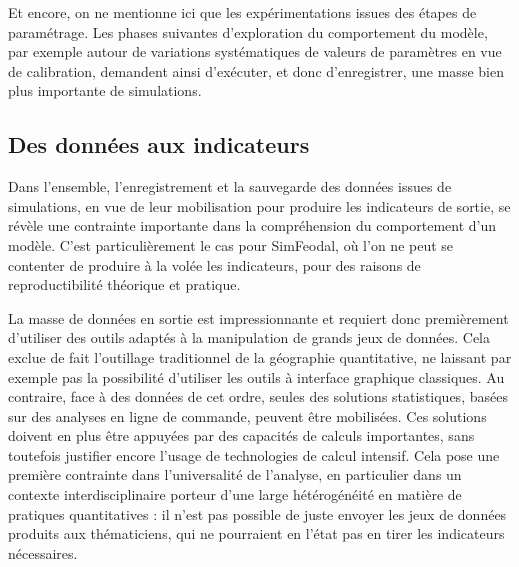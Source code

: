 	Et encore, on ne mentionne ici que les expérimentations issues des étapes de paramétrage.
	Les phases suivantes d'exploration du comportement du modèle, par exemple autour de variations systématiques de valeurs de paramètres en vue de calibration, demandent ainsi d'exécuter, et donc d'enregistrer, une masse bien plus importante de simulations.

	\subsection{Des données aux indicateurs}\label{subsec:donnees-indicateurs}
	Dans l'ensemble, l'enregistrement et la sauvegarde des données issues de simulations, en vue de leur mobilisation pour produire les indicateurs de sortie, se révèle une contrainte importante dans la compréhension du comportement d'un modèle.
	C'est particulièrement le cas pour SimFeodal, où l'on ne peut se contenter de produire à la volée les indicateurs, pour des raisons de reproductibilité théorique et pratique.

	La masse de données en sortie est impressionnante et requiert donc premièrement d'utiliser des outils adaptés à la manipulation de grands jeux de données.
	Cela exclue de fait l'outillage traditionnel de la géographie quantitative, ne laissant par exemple pas la possibilité d'utiliser les outils à interface graphique classiques.
	Au contraire, face à des données de cet ordre, seules des solutions statistiques, basées sur des analyses en ligne de commande, peuvent être mobilisées.
	Ces solutions doivent en plus être appuyées par des capacités de calculs importantes, sans toutefois justifier encore l'usage de technologies de calcul intensif.
	Cela pose une première contrainte dans l'universalité de l'analyse, en particulier dans un contexte interdisciplinaire porteur d'une large hétérogénéité en matière de pratiques quantitatives : il n'est pas possible de juste envoyer les jeux de données produits aux thématiciens, qui ne pourraient en l'état pas en tirer les indicateurs nécessaires.

